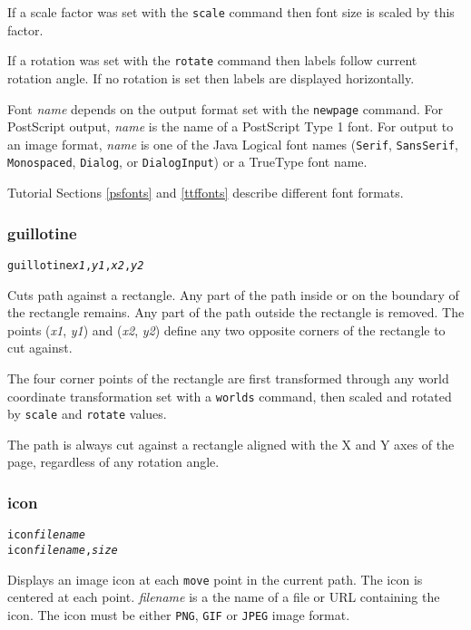 If a scale factor was set with the
\texttt{scale} command
then font size is scaled by this factor.

If a rotation was set with the
\texttt{rotate} command
then labels follow current rotation angle.
If no rotation is set then labels are displayed
horizontally.

Font \textit{name}
depends on the output format set with the
\texttt{newpage} command.
For PostScript output, \textit{name} is the name of a PostScript Type 1
font.
For output to an image format, \textit{name} is one of the Java Logical
font names (\texttt{Serif}, \texttt{SansSerif},
\texttt{Monospaced}, \texttt{Dialog}, or \texttt{DialogInput}) or a TrueType
font name.

Tutorial Sections \ref{psfonts} and \ref{ttffonts}
describe different font formats.

\subsubsection{guillotine}

\begin{alltt}
guillotine \textit{x1}, \textit{y1}, \textit{x2}, \textit{y2}
\end{alltt}

Cuts path against a rectangle.
Any part of the path inside or
on the boundary of the rectangle remains.
Any part of the path outside the rectangle is removed.
The points
(\textit{x1}, \textit{y1}) and (\textit{x2}, \textit{y2}) define
any two opposite corners of the rectangle to cut against.

The four corner points of the rectangle
are first transformed through any world coordinate
transformation set with a \texttt{worlds} command,
then scaled and rotated by \texttt{scale}
and \texttt{rotate} values.

The path is always cut against a rectangle
aligned with the X and Y axes of the page, regardless of any rotation angle.

\subsubsection{icon}

\begin{alltt}
icon \textit{filename}
icon \textit{filename}, \textit{size}
\end{alltt}

Displays an image icon at each \texttt{move} point in
the current path.  The icon is centered at each point.
\textit{filename} is a the name of a file or URL containing the icon.
The icon must be either \texttt{PNG}, \texttt{GIF} or \texttt{JPEG}
image format.


